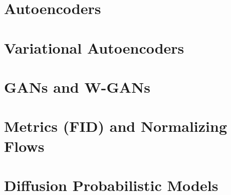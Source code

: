 \documentclass[11pt, oneside]{book}
\begin{document}


\chapter{Autoencoders}



\chapter{Variational Autoencoders}



\chapter{GANs and W-GANs}



\chapter{Metrics (FID) and Normalizing Flows}



\chapter{Diffusion Probabilistic Models}



\end{document}
